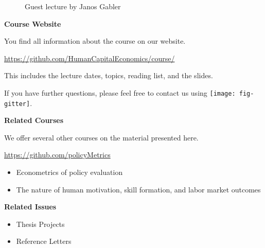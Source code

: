 \begin{frame}
	\begin{figure}
		\caption{Guest lecture by Janos Gabler}
		\centering{}
	\end{figure}
\end{frame}
\begin{frame}
	\textbf{Course Website}\vspace{0.3cm}

You find all information about the course on our website.

\begin{center}
\url{https://github.com/HumanCapitalEconomics/course/}
\end{center}

This includes the lecture dates, topics, reading list, and the slides.\vspace{0.3cm}

If you have further questions, please feel free to contact us using
\texttt{[image: fig-gitter]}.

\end{frame}
\begin{frame}
	\textbf{Related Courses}\vspace{0.3cm}

We offer several other courses on the material presented here.

	\begin{center}
	\url{https://github.com/policyMetrics}
	\end{center}


	\begin{itemize}\setlength\itemsep{1em}
	\item Econometrics of policy evaluation
	\item The nature of human motivation, skill formation, and labor market outcomes
	\end{itemize}

\end{frame}
\begin{frame}
	\textbf{Related Issues}\vspace{0.3cm}

	\begin{itemize}\setlength\itemsep{1em}
	\item Thesis Projects
	\item Reference Letters
	\end{itemize}
\end{frame}
